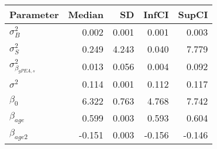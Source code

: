 \begin{table}[ht]
\centering
\begin{tabular}{lrrrr}
  \hline
Parameter & Median & SD & InfCI & SupCI \\ 
  \hline
$\sigma^{2}_{B}$ & 0.002 & 0.001 & 0.001 & 0.003 \\ 
  $\sigma^{2}_{S}$ & 0.249 & 4.243 & 0.040 & 7.779 \\ 
  $\sigma^{2}_{\beta_{gPEA,s}}$ & 0.013 & 0.056 & 0.004 & 0.092 \\ 
  $\sigma^{2}$ & 0.114 & 0.001 & 0.112 & 0.117 \\ 
  $\beta_{0}$ & 6.322 & 0.763 & 4.768 & 7.742 \\ 
  $\beta_{age}$ & 0.599 & 0.003 & 0.593 & 0.604 \\ 
  $\beta_{age2}$ & -0.151 & 0.003 & -0.156 & -0.146 \\ 
   \hline
\end{tabular}
\end{table}
